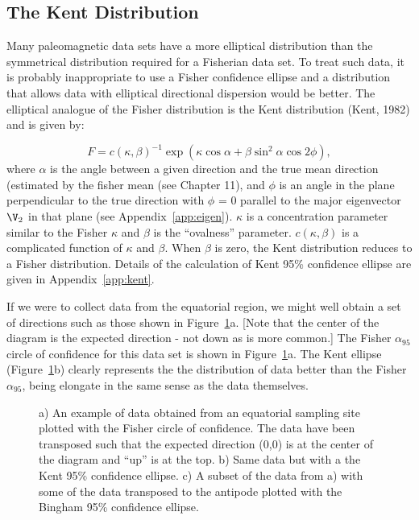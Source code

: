 \subsection{The Kent Distribution}

Many paleomagnetic data sets  have a  more elliptical distribution than the symmetrical distribution required for a Fisherian data set.   To treat such data, it is probably inappropriate to use a Fisher confidence ellipse and a distribution that allows data with elliptical directional dispersion would be better. The elliptical analogue of the Fisher distribution is the 
 Kent distribution (Kent, 1982) \nocite{kent82} and  is given by:
    
   $$
   F = c(\kappa,\beta)^{-1} \exp(\kappa \cos \alpha + \beta \sin^2 \alpha \cos 2\phi),
   $$
   \noindent where $\alpha$ is the angle between a given direction and the true mean direction (estimated by the fisher mean (see Chapter 11), and $\phi$ is an angle in the plane perpendicular to the true direction with $\phi$ = 0 parallel to the major eigenvector $\V_2$ in that plane (see Appendix~\ref{app:eigen}).  $\kappa$ is a concentration parameter similar to the Fisher $\kappa$ and $\beta$ is the ``ovalness'' parameter.  $c(\kappa,\beta)$ is a complicated function of $\kappa$ and $\beta$.  When $\beta $ is zero, the 
   Kent distribution reduces to a Fisher
distribution.    Details of the calculation of 
Kent 95\% confidence ellipse are given in Appendix~\ref{app:kent}.    

If we were to collect data from the equatorial region, we might well obtain a set of directions such as those shown in Figure~\ref{fig:confidence}a. [Note that the center of the diagram is the expected direction - not down as is more common.]    The Fisher $\alpha_{95}$ circle of confidence for this data set is shown in Figure~\ref{fig:confidence}a.    The Kent ellipse (Figure~\ref{fig:confidence}b) clearly represents the the distribution of data better than the Fisher $\alpha_{95}$, being elongate in the same sense as the data themselves.    

\begin{figure}[htb]
\epsfxsize 15cm
\centering {}
\caption{ a) An example  of data obtained from an equatorial sampling site plotted with the Fisher circle of confidence.   The data have been transposed such that the expected direction (0,0) is at the center of the diagram and ``up'' is at the top.  b) Same data but with a  the Kent 95\% confidence ellipse.  c) A subset of the data from a) with some of the data transposed to the antipode plotted with the Bingham 95\% confidence ellipse.  }
\label{fig:confidence}
\end{figure}
    

